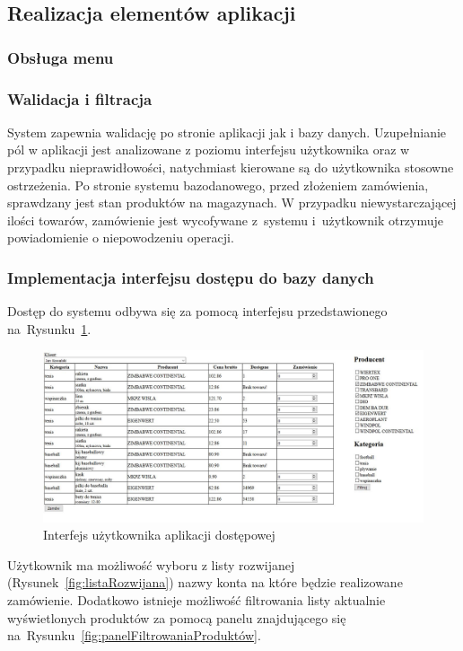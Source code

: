 \documentclass[a4paper, 12pt]{article}
\begin{document}
\subsection{Realizacja elementów aplikacji}
\subsubsection{Obsługa menu}
\subsubsection{Walidacja i filtracja}
System zapewnia walidację po stronie aplikacji jak i bazy danych. Uzupełnianie pól w aplikacji jest analizowane z poziomu interfejsu użytkownika oraz w przypadku nieprawidłowości, natychmiast kierowane są do użytkownika stosowne ostrzeżenia. Po stronie systemu bazodanowego, przed złożeniem zamówienia, sprawdzany jest stan produktów na magazynach. W przypadku niewystarczającej ilości towarów, zamówienie jest wycofywane z~systemu i~użytkownik otrzymuje powiadomienie o niepowodzeniu operacji.
\subsubsection{Implementacja interfejsu dostępu do bazy danych}
Dostęp do systemu odbywa się za pomocą interfejsu przedstawionego na~Rysunku~\ref{fig:interfejsUżytkownika}.

\begin{figure}[H]
	\includegraphics[width=14cm]{Screeny/Filtrowanie2.JPG}
	\caption[Interfejs użytkownika]{Interfejs użytkownika aplikacji dostępowej}
	\label{fig:interfejsUżytkownika}
\end{figure}

Użytkownik ma możliwość wyboru z listy rozwijanej (Rysunek~\ref{fig:listaRozwijana}) nazwy konta na które będzie realizowane zamówienie. Dodatkowo istnieje możliwość filtrowania listy aktualnie wyświetlonych produktów za pomocą panelu znajdującego się na~Rysunku~\ref{fig:panelFiltrowaniaProduktów}.
\end{document}
